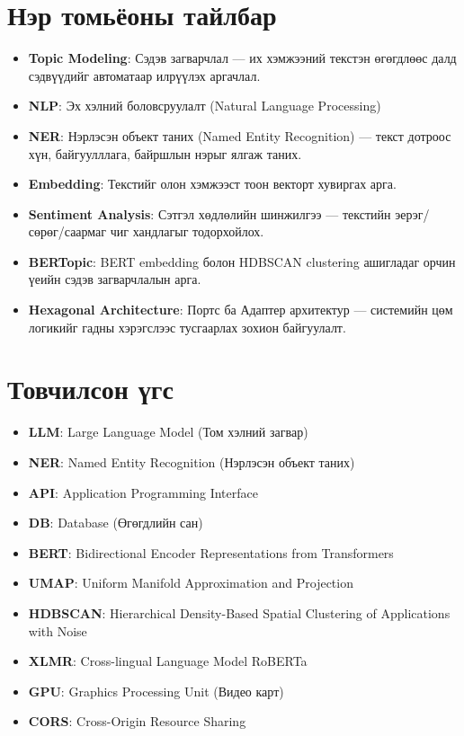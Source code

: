 \newpage
\chapter*{Нэр томьёоны тайлбар}
\begin{itemize}
    \item \textbf{Topic Modeling}: Сэдэв загварчлал — их хэмжээний текстэн өгөгдлөөс далд сэдвүүдийг автоматаар илрүүлэх аргачлал.
    \item \textbf{NLP}: Эх хэлний боловсруулалт (Natural Language Processing)
    \item \textbf{NER}: Нэрлэсэн объект таних (Named Entity Recognition) — текст дотроос хүн, байгуулллага, байршлын нэрыг ялгаж таних.
    \item \textbf{Embedding}: Текстийг олон хэмжээст тоон векторт хувиргах арга.
    \item \textbf{Sentiment Analysis}: Сэтгэл хөдлөлийн шинжилгээ — текстийн эерэг/сөрөг/саармаг чиг хандлагыг тодорхойлох.
    \item \textbf{BERTopic}: BERT embedding болон HDBSCAN clustering ашигладаг орчин үеийн сэдэв загварчлалын арга.
    \item \textbf{Hexagonal Architecture}: Портс ба Адаптер архитектур — системийн цөм логикийг гадны хэрэгслээс тусгаарлах зохион байгуулалт.
\end{itemize}

\newpage
\chapter*{Товчилсон үгс}
\begin{itemize}
    \item \textbf{LLM}: Large Language Model (Том хэлний загвар)
    \item \textbf{NER}: Named Entity Recognition (Нэрлэсэн объект таних)
    \item \textbf{API}: Application Programming Interface
    \item \textbf{DB}: Database (Өгөгдлийн сан)
    \item \textbf{BERT}: Bidirectional Encoder Representations from Transformers
    \item \textbf{UMAP}: Uniform Manifold Approximation and Projection
    \item \textbf{HDBSCAN}: Hierarchical Density-Based Spatial Clustering of Applications with Noise
    \item \textbf{XLMR}: Cross-lingual Language Model RoBERTa
    \item \textbf{GPU}: Graphics Processing Unit (Видео карт)
    \item \textbf{CORS}: Cross-Origin Resource Sharing
\end{itemize}

